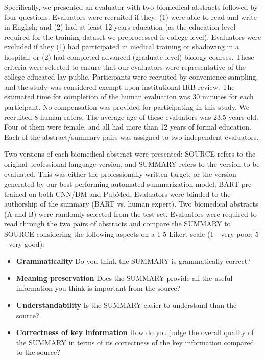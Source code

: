 \documentclass[letterpaper, table]{article} %
\begin{document}
Specifically, we presented an evaluator with two biomedical abstracts followed by four questions. Evaluators were recruited if they: (1) were able to read and write in English; and (2) had at least 12 years education (as the education level required for the training dataset we preprocessed is college level). Evaluators were excluded if they (1) had participated in medical training or shadowing in a hospital; or (2) had completed advanced (graduate level) biology courses. These criteria were selected to ensure that our evaluators were representative of the college-educated lay public. Participants were recruited by convenience sampling, and the study was considered exempt upon institutional IRB review. The estimated time for completion of the human evaluation was 30 minutes for each participant. No compensation was provided for participating in this study.  We recruited 8 human raters. 
The average age of these evaluators was 23.5 years old. Four of them were female, and all had more than 12 years of formal education. Each of the abstract/summary pairs was assigned to two independent evaluators.

Two versions of each biomedical abstract were presented: SOURCE refers to the original professional language version, and SUMMARY refers to the version to be evaluated. This was either the professionally written target, or the version generated by our best-performing automated summarization model, BART pre-trained on both CNN/DM and PubMed. Evaluators were blinded to the authorship of the summary (BART vs. human expert). Two biomedical abstracts (A and B) were randomly selected from the test set. Evaluators were required to read through the two pairs of abstracts and compare the SUMMARY to SOURCE considering the following aspects on a 1-5 Likert scale (1 - very poor; 5 - very good):
\begin{itemize}
    \item \textbf{Grammaticality} Do you think the SUMMARY is grammatically correct? 
    \item \textbf{Meaning preservation} Does the SUMMARY provide all the useful information you think is important from the source? 
    \item \textbf{Understandability} Is the SUMMARY easier to understand than the source?
    \item \textbf{Correctness of key information} How do you judge the overall quality of the SUMMARY in terms of its correctness of the key information compared to the source? 
\end{itemize}
\end{document}
